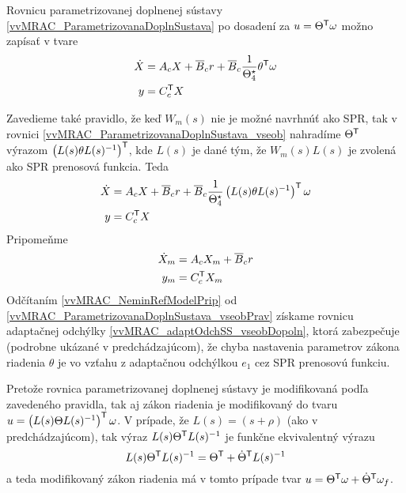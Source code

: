 \documentclass[a4paper, 10pt, ]{article}
\begin{document}
Rovnicu parametrizovanej doplnenej sústavy \eqref{vvMRAC_ParametrizovanaDoplnSustava} po dosadení za $u = \Theta^{\mathsf{T}} \omega$ možno zapísať v tvare
\begin{subequations} \label{vvMRAC_ParametrizovanaDoplnSustava_vseob}
	\begin{align}
		\dot{X} &= A_c X + \overline{B}_c r + \overline{B}_c \frac{1}{\Theta_4^\star} \theta^{\mathsf{T}} \omega \\
		y &= C_c^{\mathsf{T}} X
	\end{align}
\end{subequations}

Zavedieme také pravidlo, že keď $W_m(s)$ nie je možné navrhnúť ako SPR, tak v rovnici \eqref{vvMRAC_ParametrizovanaDoplnSustava_vseob} nahradíme $\Theta^{\mathsf{T}}$ výrazom $\left( L(s) \theta L(s)^{-1} \right)^{\mathsf{T}}$, kde $L(s)$  je dané tým, že $W_m(s)L(s)$ je zvolená ako SPR prenosová funkcia. Teda
\begin{subequations} \label{vvMRAC_ParametrizovanaDoplnSustava_vseobPrav}
	\begin{align}
		\dot{X} &= A_c X + \overline{B}_c r + \overline{B}_c \frac{1}{\Theta_4^\star} \left(  L(s)  \theta  L(s)^{-1}  \right)^{\mathsf{T}} \omega \\
		y  &= C_c^{\mathsf{T}} X
	\end{align}
\end{subequations}
Pripomeňme
\begin{subequations} \label{vvMRAC_NeminRefModelPrip}
	\begin{align}
		\dot{X}_m &= A_c X_m + \overline{B}_c r \\
		y_m &= C_c^{\mathsf{T}} X_m
	\end{align}
\end{subequations}
Odčítaním \eqref{vvMRAC_NeminRefModelPrip} od \eqref{vvMRAC_ParametrizovanaDoplnSustava_vseobPrav} získame rovnicu  adaptačnej odchýlky \eqref{vvMRAC_adaptOdchSS_vseobDopoln}, ktorá zabezpečuje (podrobne ukázané v predchádzajúcom), že chyba nastavenia parametrov zákona riadenia $\theta$ je vo vzťahu z adaptačnou odchýlkou $e_1$ cez SPR prenosovú funkciu.

Pretože rovnica parametrizovanej doplnenej sústavy je modifikovaná podľa zavedeného pravidla, tak aj zákon riadenia je modifikovaný do tvaru $u = \left( L(s) \Theta L(s)^{-1} \right)^{\mathsf{T}} \omega$. V prípade, že $L(s) = (s + \rho)$ (ako v predchádzajúcom), tak výraz $L(s) \Theta^{\mathsf{T}} L(s)^{-1}$ je funkčne ekvivalentný výrazu
\begin{equation}
	L(s) \Theta^{\mathsf{T}} L(s)^{-1} = \Theta^{\mathsf{T}} + \dot{\Theta}^{\mathsf{T}} L(s)^{-1}
\end{equation}
a teda modifikovaný zákon riadenia má v tomto prípade tvar $u = \Theta^{\mathsf{T}} \omega +  \dot \Theta^{\mathsf{T}} \omega_f$.
\end{document}
